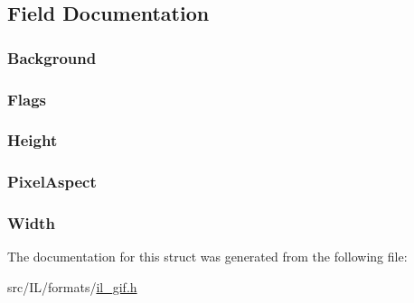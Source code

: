 \subsection{Field Documentation}
\hypertarget{struct_gif_logical_screen_descriptor_a9468a41e5676d6ca04aa9be57b5f0a3e}{
\subsubsection[{Background}]{ Background}}\label{struct_gif_logical_screen_descriptor_a9468a41e5676d6ca04aa9be57b5f0a3e}
\hypertarget{struct_gif_logical_screen_descriptor_a4d4e57f611ec63d5199ee6ea1c56077e}{
\subsubsection[{Flags}]{ Flags}}\label{struct_gif_logical_screen_descriptor_a4d4e57f611ec63d5199ee6ea1c56077e}
\hypertarget{struct_gif_logical_screen_descriptor_ab74e2bb7cc7272180be796817440ae4e}{
\subsubsection[{Height}]{ Height}}\label{struct_gif_logical_screen_descriptor_ab74e2bb7cc7272180be796817440ae4e}
\hypertarget{struct_gif_logical_screen_descriptor_a530e6f90c5ad1728974dc61cdbdb446a}{
\subsubsection[{Pixel\-Aspect}]{ Pixel\-Aspect}}\label{struct_gif_logical_screen_descriptor_a530e6f90c5ad1728974dc61cdbdb446a}
\hypertarget{struct_gif_logical_screen_descriptor_aed0f0a923b8346ba51a4de45fff77ee7}{
\subsubsection[{Width}]{ Width}}\label{struct_gif_logical_screen_descriptor_aed0f0a923b8346ba51a4de45fff77ee7}


The documentation for this struct was generated from the following file\-:\begin{DoxyCompactItemize}
\item 
src/\-I\-L/formats/\hyperlink{il__gif_8h}{il\-\_\-gif.\-h}\end{DoxyCompactItemize}
